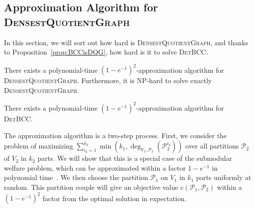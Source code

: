 \subsection{Approximation Algorithm for \textsc{DensestQuotientGraph}}
In this section, we will sort out how hard is \textsc{DensestQuotientGraph}, and thanks to Proposition~\ref{prop:BCCisDQG}, how hard is it to solve \textsc{DetBCC}.

\begin{theorem}
  \label{theo:DQGapprox}
  There exists a polynomial-time $(1-e^{-1})^2$-approximation algorithm for \textsc{DensestQuotientGraph}. Furthermore, it is \textrm{NP}-hard to solve exactly \textsc{DensestQuotientGraph}.
\end{theorem}

\begin{corollary}
  \label{theo:DetBCCapprox}
  There exists a polynomial-time $(1-e^{-1})^2$-approximation algorithm for \textsc{DetBCC}.
\end{corollary}

The approximation algorithm is a two-step process. First, we consider the problem of maximizing $\sum_{i_2=1}^{k_2}\min\left(k_1,\deg_{V_1,\mathcal{P}_2}(\mathcal{P}_2^{i_2})\right)$ over all partitions $\mathcal{P}_2$ of $V_2$ in $k_2$ parts. We will show that this is a special case of the submodular welfare problem, which can be approximated within a factor $1-e^{-1}$ in polynomial time~\cite{Vondrak08}. We then choose the partition $\mathcal{P}_1$ on $V_1$ in $k_1$ parts uniformly at random. This partition couple will give an objective value $e(\mathcal{P}_1,\mathcal{P}_2)$ within a $(1-e^{-1})^2$ factor from the optimal solution in expectation.

